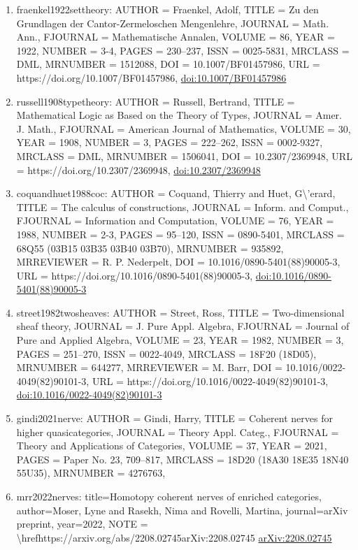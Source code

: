 \documentclass[11pt]{article}
\begin{document}
\begin{enumerate}[leftmargin=*]
  \item fraenkel1922settheory: AUTHOR = Fraenkel, Adolf, TITLE = Zu den Grundlagen der Cantor-Zermeloschen Mengenlehre, JOURNAL = Math. Ann., FJOURNAL = Mathematische Annalen, VOLUME = 86, YEAR = 1922, NUMBER = 3-4, PAGES = 230--237, ISSN = 0025-5831, MRCLASS = DML, MRNUMBER = 1512088, DOI = 10.1007/BF01457986, URL = https://doi.org/10.1007/BF01457986, \href{https://doi.org/10.1007/BF01457986}{doi:10.1007/BF01457986}
  \item russell1908typetheory: AUTHOR = Russell, Bertrand, TITLE = Mathematical Logic as Based on the Theory of Types, JOURNAL = Amer. J. Math., FJOURNAL = American Journal of Mathematics, VOLUME = 30, YEAR = 1908, NUMBER = 3, PAGES = 222--262, ISSN = 0002-9327, MRCLASS = DML, MRNUMBER = 1506041, DOI = 10.2307/2369948, URL = https://doi.org/10.2307/2369948, \href{https://doi.org/10.2307/2369948}{doi:10.2307/2369948}
  \item coquandhuet1988coc: AUTHOR = Coquand, Thierry and Huet, G\textbackslash{}'erard, TITLE = The calculus of constructions, JOURNAL = Inform. and Comput., FJOURNAL = Information and Computation, VOLUME = 76, YEAR = 1988, NUMBER = 2-3, PAGES = 95--120, ISSN = 0890-5401, MRCLASS = 68Q55 (03B15 03B35 03B40 03B70), MRNUMBER = 935892, MRREVIEWER = R. P. Nederpelt, DOI = 10.1016/0890-5401(88)90005-3, URL = https://doi.org/10.1016/0890-5401(88)90005-3, \href{https://doi.org/10.1016/0890-5401(88)90005-3}{doi:10.1016/0890-5401(88)90005-3}
  \item street1982twosheaves: AUTHOR = Street, Ross, TITLE = Two-dimensional sheaf theory, JOURNAL = J. Pure Appl. Algebra, FJOURNAL = Journal of Pure and Applied Algebra, VOLUME = 23, YEAR = 1982, NUMBER = 3, PAGES = 251--270, ISSN = 0022-4049, MRCLASS = 18F20 (18D05), MRNUMBER = 644277, MRREVIEWER = M. Barr, DOI = 10.1016/0022-4049(82)90101-3, URL = https://doi.org/10.1016/0022-4049(82)90101-3, \href{https://doi.org/10.1016/0022-4049(82)90101-3}{doi:10.1016/0022-4049(82)90101-3}
  \item gindi2021nerve: AUTHOR = Gindi, Harry, TITLE = Coherent nerves for higher quasicategories, JOURNAL = Theory Appl. Categ., FJOURNAL = Theory and Applications of Categories, VOLUME = 37, YEAR = 2021, PAGES = Paper No. 23, 709--817, MRCLASS = 18D20 (18A30 18E35 18N40 55U35), MRNUMBER = 4276763,
  \item mrr2022nerves: title=Homotopy coherent nerves of enriched categories, author=Moser, Lyne and Rasekh, Nima and Rovelli, Martina, journal=arXiv preprint, year=2022, NOTE = \textbackslash{}hrefhttps://arxiv.org/abs/2208.02745arXiv:2208.02745 \href{https://arxiv.org/abs/2208.02745}{arXiv:2208.02745}

\end{enumerate}
\end{document}
